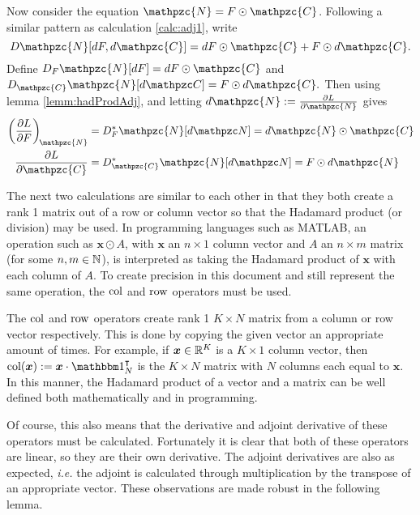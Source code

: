 \begin{calc}[Adjoint \#2]\label{calc:adj2}	
Now consider the equation \( \mathpzc{N}=F\odot\mathpzc{C} \). Following a similar pattern as calculation \ref{calc:adj1}, write 
\begin{equation}\label{eqn:DYcalc2}
D\mathpzc{N}[dF,d\mathpzc{C}] = dF\odot\mathpzc{C}+F\odot d\mathpzc{C}.
\end{equation}
Define \( D_F\mathpzc{N}[dF] =  dF\odot\mathpzc{C}\) and \( D_{\mathpzc{C}}\mathpzc{N}[d\mathpzc C] = F\odot d\mathpzc{C}. \) Then using lemma \ref{lemm:hadProdAdj}, and letting \( d\mathpzc{N}:=\pdv{L}{\mathpzc{N}} \) gives
\begin{align}
\left(\pdv{L}{F}\right)_{\!\mathpzc{N}} &= D_F^{\ast}\mathpzc{N}[d\mathpzc N] = d\mathpzc{N}\odot\mathpzc{C}\label{eqn:gradcalc3}\\
\pdv{L}{\mathpzc{C}} &= D_{\mathpzc{C}}^{\ast}\mathpzc{N}[d\mathpzc N] =F\odot d\mathpzc{N}\label{eqn:gradcalc4}
\end{align}
\end{calc}

The next two calculations are similar to each other in that they both create a rank 1 matrix out of a row or column vector so that the Hadamard product (or division) may be used.  In programming languages such as MATLAB, an operation such as \( \bm x\odot A \), with \( \bm x \) an \( n\times 1 \) column vector and \( A \) an \(n\times m\) matrix (for some \(n,m\in\mathbb N\)), is interpreted as taking the Hadamard product of \(\bm x \) with each column of \( A \). To create precision in this document and still represent the same operation, the \( \operatorname{col} \) and \( \operatorname{row} \) operators must be used.

The \( \operatorname{col} \) and \( \operatorname{row} \) operators create rank 1 \( K\times N \) matrix from a column or row vector respectively.  This is done by copying the given vector an appropriate amount of times. For example, if \( \bm x\in\mathbb R^K \) is a \( K\times 1 \) column vector, then \( \op{col}(\bm x) \defined \bm x\cdot\mathbbm 1_N^{\intercal}\) is the \( K\times N \) matrix with \( N \) columns each equal to \(\bm x.\) In this manner, the Hadamard product of a vector and a matrix can be well defined both mathematically and in programming.  

Of course, this also means that the derivative and adjoint derivative of these operators must be calculated.  Fortunately it is clear that both of these operators are linear, so they are their own derivative. The adjoint derivatives are also as expected, \textit{i.e.} the adjoint is calculated through multiplication by the transpose of an appropriate vector. These observations are made robust in the following lemma.

